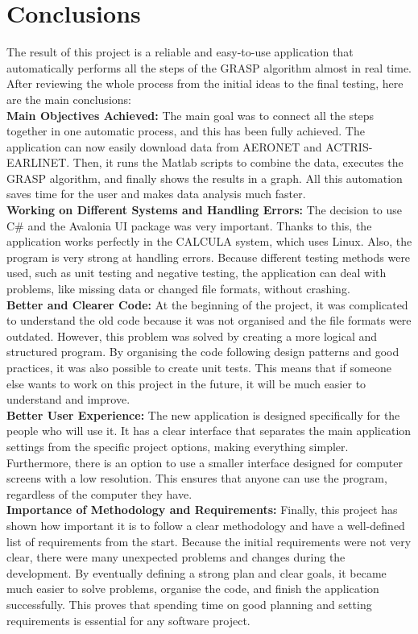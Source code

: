 \section{Conclusions}
The result of this project is a reliable and easy-to-use application that automatically performs all the steps of the GRASP algorithm almost in real time. After reviewing the whole process from the initial ideas to the final testing, here are the main conclusions:
\smallskip\\\textbf{Main Objectives Achieved:} The main goal was to connect all the steps together in one automatic process, and this has been fully achieved. The application can now easily download data from AERONET and ACTRIS-EARLINET. Then, it runs the Matlab scripts to combine the data, executes the GRASP algorithm, and finally shows the results in a graph. All this automation saves time for the user and makes data analysis much faster.
\smallskip\\\textbf{Working on Different Systems and Handling Errors:} The decision to use C\# and the Avalonia UI package was very important. Thanks to this, the application works perfectly in the CALCULA system, which uses Linux. Also, the program is very strong at handling errors. Because different testing methods were used, such as unit testing and negative testing, the application can deal with problems, like missing data or changed file formats, without crashing. 
\smallskip\\\textbf{Better and Clearer Code:} At the beginning of the project, it was complicated to understand the old code because it was not organised and the file formats were outdated. However, this problem was solved by creating a more logical and structured program. By organising the code following design patterns and good practices, it was also possible to create unit tests. This means that if someone else wants to work on this project in the future, it will be much easier to understand and improve.
\smallskip\\\textbf{Better User Experience:} The new application is designed specifically for the people who will use it. It has a clear interface that separates the main application settings from the specific project options, making everything simpler. Furthermore, there is an option to use a smaller interface designed for computer screens with a low resolution. This ensures that anyone can use the program, regardless of the computer they have.
\smallskip\\\textbf{Importance of Methodology and Requirements:} Finally, this project has shown how important it is to follow a clear methodology and have a well-defined list of requirements from the start. Because the initial requirements were not very clear, there were many unexpected problems and changes during the development. By eventually defining a strong plan and clear goals, it became much easier to solve problems, organise the code, and finish the application successfully. This proves that spending time on good planning and setting requirements is essential for any software project.
